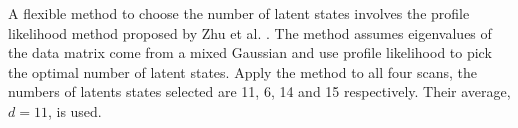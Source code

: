 \documentclass[fleqn,12pt]{article}
\let\oldref\ref
\renewcommand{\ref}[1]{(\oldref{#1})}
\begin{document}

A flexible method to choose the number of latent states involves the profile likelihood method proposed by Zhu et al. \citep{zhu2006automatic}. The method assumes eigenvalues of the data matrix come from a mixed Gaussian and use profile likelihood to pick the optimal number of latent states. Apply the method to all four scans, the numbers of latents states selected are 11, 6, 14 and 15 respectively. Their average, $d=11$, is used.



\end{document}
